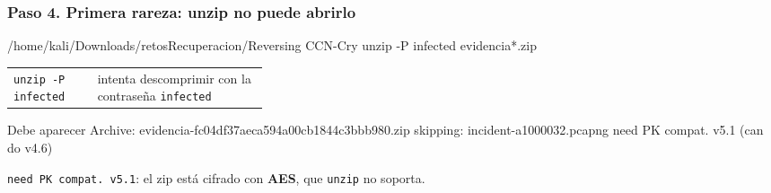 \documentclass[11pt,a4paper]{article}
\begin{document}
\subsubsection*{Paso 4. Primera rareza: unzip no puede abrirlo}
\begin{comando}{/home/kali/Downloads/retosRecuperacion/Reversing CCN-Cry}
unzip -P infected evidencia*.zip
\end{comando}
\begin{tcolorbox}[enhanced, breakable, colback=gray!3, colframe=gray!35, boxrule=0.3pt, arc=1pt, left=4pt, right=4pt, top=2pt, bottom=2pt, fonttitle=\sffamily\scriptsize\bfseries, coltitle=black!70, colbacktitle=gray!10, title={Qué hace cada parte}, attach title to upper, before skip=2pt, after skip=4pt, fontupper=\small]
\par{\renewcommand{\arraystretch}{1.12}\begin{tabularx}{\linewidth}{@{}>{\raggedright\arraybackslash}p{0.33\linewidth}>{\raggedright\arraybackslash}X@{}}
\texttt{unzip -P infected} & intenta descomprimir con la contraseña \texttt{infected} \\
\end{tabularx}}
\end{tcolorbox}
\begin{salida}{Debe aparecer}
Archive:  evidencia-fc04df37aeca594a00cb1844c3bbb980.zip
   skipping: incident-a1000032.pcapng  need PK compat. v5.1 (can do v4.6)
\end{salida}
\begin{nota}\texttt{need PK compat. v5.1}: el zip está cifrado con \textbf{AES}, que \texttt{unzip} no soporta.\end{nota}
\end{document}
